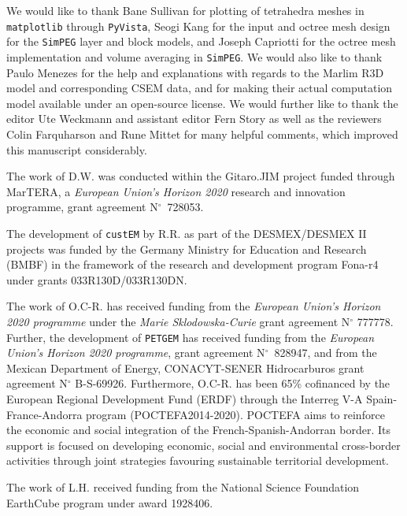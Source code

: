 \documentclass[a4paper, extra, camera,%
]{gji}
\newcommand{\simpeg}{\texttt{SimPEG}\xspace}
\newcommand{\custem}{\texttt{custEM}\xspace}
\newcommand{\petgem}{\texttt{PETGEM}\xspace}
\begin{document}
\begin{acknowledgments}

We would like to thank Bane Sullivan for plotting of tetrahedra meshes in \texttt{matplotlib} through \texttt{PyVista}, Seogi Kang for the input and octree mesh design for the \simpeg layer and block models, and Joseph Capriotti for the octree mesh implementation and volume averaging in \simpeg. We would also like to thank Paulo Menezes for the help and explanations with regards to the Marlim R3D model and corresponding CSEM data, and for making their actual computation model available under an open-source license. We would further like to thank the editor Ute Weckmann and assistant editor Fern Story as well as the reviewers Colin Farquharson and Rune Mittet for many helpful comments, which improved this manuscript considerably.

The work of D.W. was conducted within the Gitaro.JIM project funded through MarTERA, a \emph{European Union's Horizon 2020} research and innovation programme, grant agreement N$^\circ$~728053.

The development of \custem by R.R. as part of the DESMEX/DESMEX II projects was funded by the Germany Ministry for Education and Research (BMBF) in the framework of the research and development program Fona-r4 under grants 033R130D/033R130DN.

The work of O.C-R. has received funding from the \emph{European Union's Horizon 2020 programme} under the \emph{Marie Sklodowska-Curie} grant agreement N$^\circ$ 777778. Further, the development of \petgem has received funding from the \emph{European Union's Horizon 2020 programme}, grant agreement N$^\circ$~828947, and from the Mexican Department of Energy, CONACYT-SENER Hidrocarburos grant agreement N$^\circ$ B-S-69926. Furthermore, O.C-R. has been 65\% cofinanced by the European Regional Development Fund (ERDF) through the Interreg V-A Spain-France-Andorra program (POCTEFA2014-2020). POCTEFA aims to reinforce the economic and social integration of the French-Spanish-Andorran border. Its support is focused on developing economic, social and environmental cross-border activities through joint strategies favouring sustainable territorial development.

The work of L.H. received funding from the National Science Foundation EarthCube program under award 1928406.
\end{acknowledgments}




\label{lastpage}
\end{document}
